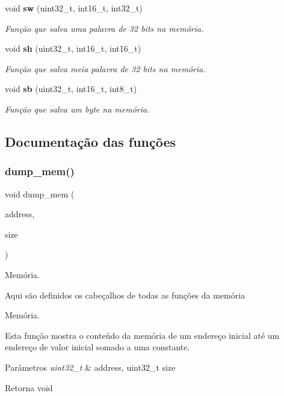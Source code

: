 \begin{DoxyCompactItemize}
void \textbf{ sw} (uint32\+\_\+t, int16\+\_\+t, int32\+\_\+t)
\begin{DoxyCompactList}\small\item\em Função que salva uma palavra de 32 bits na memória. \end{DoxyCompactList}\item 
void \textbf{ sh} (uint32\+\_\+t, int16\+\_\+t, int16\+\_\+t)
\begin{DoxyCompactList}\small\item\em Função que salva meia palavra de 32 bits na memória. \end{DoxyCompactList}\item 
void \textbf{ sb} (uint32\+\_\+t, int16\+\_\+t, int8\+\_\+t)
\begin{DoxyCompactList}\small\item\em Função que salva um byte na memória. \end{DoxyCompactList}\end{DoxyCompactItemize}


\subsection{Documentação das funções}
\mbox{\label{memory_8h_a6cbcfd8ab7562a601d0da896abc66aeb}} 
\subsubsection{dump\+\_\+mem()}
{\footnotesize\ttfamily void dump\+\_\+mem (\begin{DoxyParamCaption}\item[{uint32\+\_\+t}]{address,  }\item[{uint32\+\_\+t}]{size }\end{DoxyParamCaption})}



Memória. 

Aqui são definidos os cabeçalhos de todas as funções da memória

Memória.

Esta função mostra o conteúdo da memória de um endereço inicial até um endereço de valor inicial somado a uma constante. 
\begin{DoxyParams}{Parâmetros}
{\em uint32\+\_\+t} & address, uint32\+\_\+t size \\
\hline
\end{DoxyParams}
\begin{DoxyReturn}{Retorna}
void 
\end{DoxyReturn}


